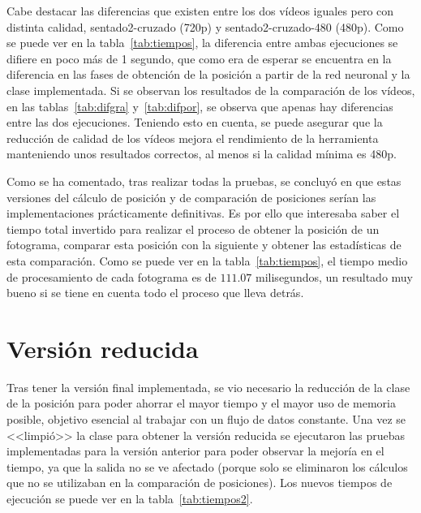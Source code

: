 {Cabe destacar las diferencias que existen entre los dos vídeos iguales pero con distinta calidad, sentado2-cruzado (720p) y sentado2-cruzado-480 (480p). Como se puede ver en la tabla~\ref{tab:tiempos}, la diferencia entre ambas ejecuciones se difiere en poco más de 1 segundo, que como era de esperar se encuentra en la diferencia en las fases de obtención de la posición a partir de la red neuronal y la clase implementada. Si se observan los resultados de la comparación de los vídeos, en las tablas~\ref{tab:difgra} y~\ref{tab:difpor}, se observa que apenas hay diferencias entre las dos ejecuciones. Teniendo esto en cuenta, se puede asegurar que la reducción de calidad de los vídeos mejora el rendimiento de la herramienta manteniendo unos resultados correctos, al menos si la calidad mínima es 480p.

Como se ha comentado, tras realizar todas la pruebas, se concluyó en que estas versiones del cálculo de posición y de comparación de posiciones serían las implementaciones prácticamente definitivas. Es por ello que interesaba saber el tiempo total invertido para realizar el proceso de obtener la posición de un fotograma, comparar esta posición con la siguiente y obtener las estadísticas de esta comparación. Como se puede ver en la tabla~\ref{tab:tiempos}, el tiempo medio de procesamiento de cada fotograma es de $111.07$ milisegundos, un resultado muy bueno si se tiene en cuenta todo el proceso que lleva detrás.

\section{Versión reducida} \label{reducida}
Tras tener la versión final implementada, se vio necesario la reducción de la clase de la posición para poder ahorrar el mayor tiempo y el mayor uso de memoria posible, objetivo esencial al trabajar con un flujo de datos constante. Una vez se <<limpió>> la clase para obtener la versión reducida se ejecutaron las pruebas implementadas para la versión anterior para poder observar la mejoría en el tiempo, ya que la salida no se ve afectado (porque solo se eliminaron los cálculos que no se utilizaban en la comparación de posiciones). Los nuevos tiempos de ejecución se puede ver en la tabla~\ref{tab:tiempos2}.

}
